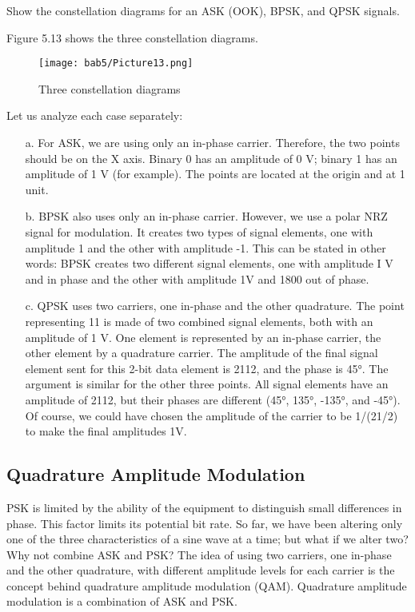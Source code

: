 \begin{example}
  Show the constellation diagrams for an ASK (OOK), BPSK, and QPSK signals.
\end{example}

\begin{solution}
  Figure 5.13 shows the three constellation diagrams.

  \begin{figure}
    \centering
    \texttt{[image: bab5/Picture13.png]}
    \caption{Three constellation diagrams}
    \label{fig5:13}
  \end{figure}

  Let us analyze each case separately:
  \begin{itemize}
    \item[a.] For ASK, we are using only an in-phase carrier. Therefore, the two points should be on the X axis. Binary 0 has an amplitude of 0 V; binary 1 has an amplitude of 1 V (for example). The points are located at the origin and at 1 unit.
    \item[b.] BPSK also uses only an in-phase carrier. However, we use a polar NRZ signal for modulation. It creates two types of signal elements, one with amplitude 1 and the other with amplitude -1. This can be stated in other words: BPSK creates two different signal elements, one with amplitude I V and in phase and the other with amplitude 1V and 1800 out of phase.
    \item[c.] QPSK uses two carriers, one in-phase and the other quadrature. The point representing 11 is made of two combined signal elements, both with an amplitude of 1 V. One element is represented by an in-phase carrier, the other element by a quadrature carrier. The amplitude of the final signal element sent for this 2-bit data element is 2112, and the phase is 45°. The argument is similar for the other three points. All signal elements have an amplitude of 2112, but their phases are different (45°, 135°, -135°, and -45°). Of course, we could have chosen the amplitude of the carrier to be 1/(21/2) to make the final amplitudes 1V.
  \end{itemize}
\end{solution}

\subsection{Quadrature Amplitude Modulation}
PSK is limited by the ability of the equipment to distinguish small differences in phase. This factor limits its potential bit rate. So far, we have been altering only one of the three characteristics of a sine wave at a time; but what if we alter two? Why not combine ASK and PSK? The idea of using two carriers, one in-phase and the other quadrature, with different amplitude levels for each carrier is the concept behind quadrature amplitude modulation (QAM). Quadrature amplitude modulation is a combination of ASK and PSK.

